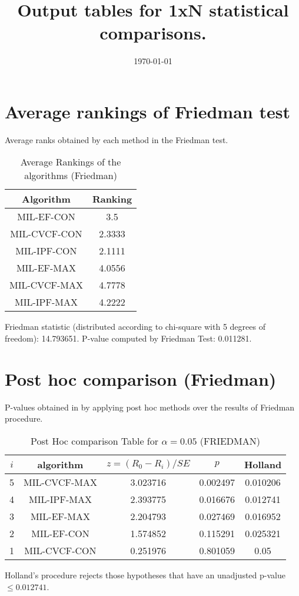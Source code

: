\documentclass[a4paper,10pt]{article}
\title{Output tables for 1xN statistical comparisons.}
\author{}
\date{\today}
\begin{document}
\begin{landscape}
\pagestyle{empty}
\maketitle
\thispagestyle{empty}

\section{Average rankings of Friedman test}


Average ranks obtained by each method in the Friedman test.

\begin{table}[!htp]
\centering
\begin{tabular}{|c|c|}\hline
Algorithm&Ranking\\\hline
MIL-EF-CON&3.5\\MIL-CVCF-CON&2.3333\\MIL-IPF-CON&2.1111\\MIL-EF-MAX&4.0556\\MIL-CVCF-MAX&4.7778\\MIL-IPF-MAX&4.2222\\\hline\end{tabular}
\caption{Average Rankings of the algorithms (Friedman)}
\end{table}

Friedman statistic (distributed according to chi-square with 5 degrees of freedom): 14.793651. \newline P-value computed by Friedman Test: 0.011281.\newline


\newpage

\section{Post hoc comparison (Friedman)}


P-values obtained in by applying post hoc methods over the results of Friedman procedure.

\begin{table}[!htp]
\centering\footnotesize
\begin{tabular}{ccccc}
$i$&algorithm&$z=(R_0 - R_i)/SE$&$p$&Holland\\
\hline5&MIL-CVCF-MAX&3.023716&0.002497&0.010206\\4&MIL-IPF-MAX&2.393775&0.016676&0.012741\\3&MIL-EF-MAX&2.204793&0.027469&0.016952\\2&MIL-EF-CON&1.574852&0.115291&0.025321\\1&MIL-CVCF-CON&0.251976&0.801059&0.05\\\hline
\end{tabular}
\caption{Post Hoc comparison Table for $\alpha=0.05$ (FRIEDMAN)}
\end{table}Holland's procedure rejects those hypotheses that have an unadjusted p-value $\le0.012741$.



\end{landscape}
\end{document}
